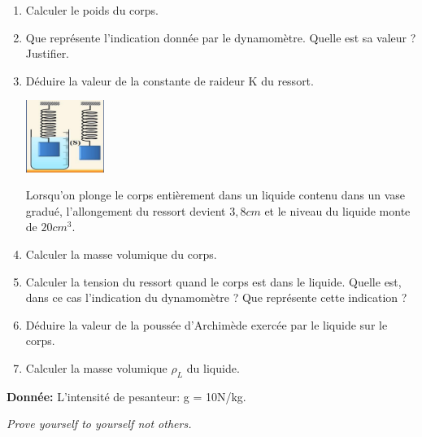 \documentclass[12pt]{article}
\begin{document}
\begin{enumerate}
	\item Calculer le poids du corps.
	\item  Que représente l’indication donnée par le dynamomètre. Quelle est sa
valeur ? Justifier.
\item  Déduire la valeur de la constante de raideur K du ressort.

	\vspace{-0.5cm}
 \begin{center}	
	 \includegraphics[width=0.2\textwidth]{./img/img02.png}
\end{center}
	\vspace{-0.5cm}

	\hspace{-1cm}Lorsqu’on plonge le corps entièrement dans un liquide contenu dans un
vase gradué, l’allongement du ressort devient $3,8 cm$ et le niveau du liquide
monte de $20cm^3$.

	\item	Calculer la masse volumique du corps.
	\item Calculer la tension du ressort quand le corps est dans le liquide. Quelle est, dans ce cas l’indication
du dynamomètre ? Que représente cette indication ?\dotfill{1pt}
\item  Déduire la valeur de la poussée d'Archimède exercée par le liquide sur le corps.\dotfill{1pt}
\item Calculer la masse volumique $\rho_L$ du liquide.\dotfill{1pt}
\end{enumerate}
\textbf{Donnée: }L'intensité de pesanteur: g = 10N/kg.

\begin{center}
\hrulefill
    \emph{Prove yourself to yourself not others.}
\hrulefill\\
\end{center}
\end{document}
